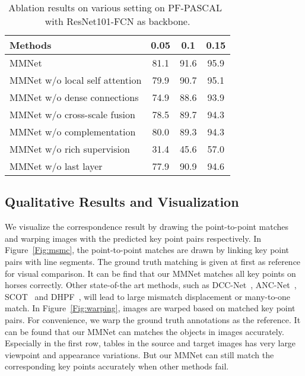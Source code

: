 \begin{table}
\centering
\normalsize
\begin{tabular}{l |c c c}
\toprule[1pt]
     Methods & 0.05 & 0.1& 0.15 \\ \hline 
    MMNet  & 81.1 & 91.6 & 95.9 \\ \hline
MMNet w/o local self attention   & 79.9 & 90.7& 95.1\\
    MMNet w/o dense connections   & 74.9 & 88.6 & 93.9\\
    MMNet w/o cross-scale fusion & 78.5 & 89.7& 94.3\\
    MMNet w/o complementation  & {80.0} & {89.3} & {94.3}\\ 
    MMNet w/o rich supervision   & 31.4 & 45.6 & 57.0\\ 
    MMNet w/o last layer & 77.9&90.9 &94.6 \\
    \bottomrule[1pt]
\end{tabular}
 \vspace{5pt}
\caption{Ablation results on various setting on PF-PASCAL~\cite{ham2017proposal} with ResNet101-FCN as backbone.}
\label{Tab:ablation_data}
\end{table}


\subsection{Qualitative Results and Visualization}\label{qualitatives}
We visualize the correspondence result by drawing the point-to-point matches and warping images with the predicted key point pairs respectively. In Figure~\ref{Fig:msmc}, the point-to-point matches are drawn by linking key point pairs with line segments. The ground truth matching is given at first as reference for visual comparison. It can be find that our MMNet matches all key points on horses correctly. Other state-of-the art methods, such as DCC-Net~\cite{dccnet}, ANC-Net~\cite{li2020correspondence}, SCOT~\cite{liu2020semantic} and DHPF~\cite{min2020learning}, will lead to large mismatch displacement or  many-to-one match. In Figure~\ref{Fig:warping}, images are warped based on matched key point pairs. For convenience, we warp the ground truth annotations as the reference. It can be found that our MMNet can matches the objects in images accurately. Especially in the first row, tables in the source and target images has very large viewpoint and appearance variations. But our MMNet can still match the corresponding key points accurately when other methods fail.
